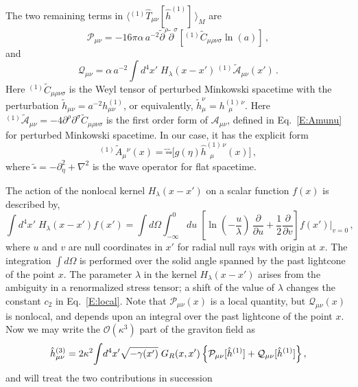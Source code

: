 \documentclass[preprint,prd,showpacs,superscriptaddress]{revtex4}
\begin{document}
  The two remaining terms in $\langle{}^{(1)}\hat{T}_{\mu\nu}[\hat{h}^{(1)}]\,\rangle_M$ are 
 \begin{equation}
 \mathcal{P}_{\mu\nu}=
 -16\pi\alpha\,a^{-2}\tilde{\partial}^{\rho}\tilde{\partial}^{\sigma}\left[ {}^{(1)}\tilde{C}_{\mu\rho\nu\sigma}\ln(a)\right]\,,
 \label{E:Pmunu}
\end{equation}
and
\begin{equation}
\mathcal{Q}_{\mu\nu} =\alpha\,a^{-2}\int\!d^{4}x'\;H_{\lambda}(x-x')\,{}^{(1)}\!\tilde{\mathcal{A}}_{\mu\nu}(x')\,.
 \label{E:Qmunu}
\end{equation}
Here ${}^{(1)}\tilde{C}_{\mu\rho\nu\sigma}$ is the Weyl tensor of perturbed Minkowski spacetime with the perturbation 
$\tilde{h}_{\mu\nu}=a^{-2}h^{(1)}_{\mu\nu}$,  or equivalently,  $\tilde{h}_\mu^\nu=  {h}^{(1)\,\nu}_{\;\;\mu}$.  Here
${}^{(1)}\!\tilde{\mathcal{A}}_{\mu\nu}=-4\partial^{\rho}\partial^{\sigma}\tilde{C}_{\mu\rho\nu\sigma}$ 
is the first order form of $\mathcal{A}_{\mu\nu}$, defined in Eq.~\eqref{E:Amunu} for perturbed Minkowski spacetime. 
In our case, it has the explicit form
\begin{equation}
{}^{(1)}\!\tilde{A}_{\mu}{}^{\nu}(x)=\widetilde{\square}\widetilde{\square}\bigl[g(\eta)\hat{h}^{(1)\,\nu}_{\;\;\mu}(x)\bigr]\,,
\label{E:A-tilde}
\end{equation}
where $\widetilde{\square} = -{\partial}_{\eta}^2 +\nabla^2$ is the wave operator for flat spacetime.
 
  The action of the nonlocal kernel $H_{\lambda}(x-x')$ on a scalar function $f(x)$ is described by,
\begin{equation}\label{E:H-def}
	\int\!d^{4}x'\;H_{\lambda}(x-x')f(x')=
	\int\!d\Omega\int_{-\infty}^{0}\!du\;\left[\ln\left(-\frac{u}{\lambda}\right)\,\frac{\partial}{\partial u}+
	\frac{1}{2}\frac{\partial}{\partial v}\right]f(x')\bigg|_{v=0}\,,
\end{equation}
where $u$ and $v$ are null coordinates in $x'$ for radial null rays with origin at $x$. The integration $\displaystyle{\int d\Omega}$ 
is performed over the solid angle spanned by the past lightcone of the point $x$. The parameter $\lambda$ in the kernel 
$H_{\lambda}(x-x')$ arises from the ambiguity in a renormalized stress tensor; a shift of the value of $\lambda$ changes the 
constant $c_2$ in Eq.~\eqref{E:local}. Note that $\mathcal{P}_{\mu\nu}(x)$ is a local quantity, but $\mathcal{Q}_{\mu\nu}(x)$ is
nonlocal, and depends upon an integral over the past lightcone of the point $x$.
Now we may write the $\mathcal{O}(\kappa^3)$ part of the graviton field as
 \begin{equation}\label{E:h3a}
	\hat{h}^{(3)}_{\mu\nu}=2\kappa^{2}\!\int\!d^{4}x'\sqrt{-\gamma(x')}\;G_{R}(x,x')\,\Bigl\{\mathcal{P}_{\mu\nu}[\hat{h}^{(1)}]+
	\mathcal{Q}_{\mu\nu}[\hat{h}^{(1)}]\Bigr\}\,,
\end{equation}
and will treat the two contributions in succession
\end{document}
